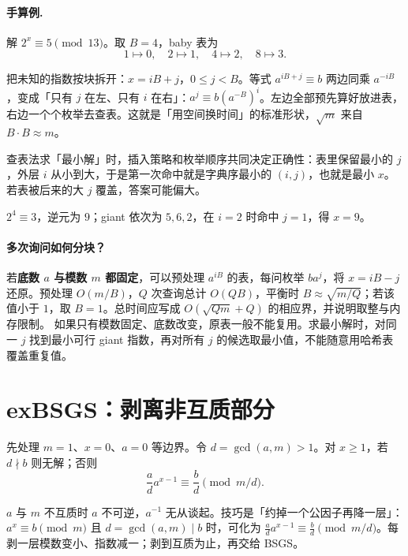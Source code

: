\documentclass[UTF8,a4paper,11pt,twoside,openright,fontset=fandol]{ctexbook}
\theoremstyle{definition}
\begin{document}
\paragraph{手算例.} 解 $2^x\equiv5\pmod{13}$。取 $B=4$，baby 表为
\[
1\mapsto0,\quad2\mapsto1,\quad4\mapsto2,\quad8\mapsto3.
\]

\begin{tip}
把未知的指数按块拆开：$x=iB+j$，$0\le j<B$。等式 $a^{iB+j}\equiv b$ 两边同乘 $a^{-iB}$，变成「只有 $j$ 在左、只有 $i$ 在右」：$a^j\equiv b(a^{-B})^i$。左边全部预先算好放进表，右边一个个枚举去查表。这就是「用空间换时间」的标准形状，$\sqrt m$ 来自 $B\cdot B\approx m$。
\end{tip}

\begin{tip}
查表法求「最小解」时，插入策略和枚举顺序共同决定正确性：表里保留最小的 $j$，外层 $i$ 从小到大，于是第一次命中就是字典序最小的 $(i,j)$，也就是最小 $x$。若表被后来的大 $j$ 覆盖，答案可能偏大。
\end{tip}

$2^4\equiv3$，逆元为 $9$；giant 依次为 $5,6,2$，在 $i=2$ 时命中 $j=1$，得 $x=9$。

\paragraph{多次询问如何分块？}
若\textbf{底数 $a$ 与模数 $m$ 都固定}，可以预处理 $a^{iB}$ 的表，每问枚举 $ba^j$，将 $x=iB-j$ 还原。预处理 $O(m/B)$，$Q$ 次查询总计 $O(QB)$，平衡时 $B\approx\sqrt{m/Q}$；若该值小于 $1$，取 $B=1$。总时间应写成 $O(\sqrt{Qm}+Q)$ 的相应界，并说明取整与内存限制。
如果只有模数固定、底数改变，原表一般不能复用。求最小解时，对同一 $j$ 找到最小可行 giant 指数，再对所有 $j$ 的候选取最小值，不能随意用哈希表覆盖重复值。


\section{exBSGS：剥离非互质部分}
先处理 $m=1$、$x=0$、$a=0$ 等边界。令 $d=\gcd(a,m)>1$。对 $x\ge1$，若 $d\nmid b$ 则无解；否则
\[
 \frac ad a^{x-1}\equiv\frac bd\pmod{m/d}.
\]

\begin{tip}
$a$ 与 $m$ 不互质时 $a$ 不可逆，$a^{-1}$ 无从谈起。技巧是「约掉一个公因子再降一层」：$a^x\equiv b\pmod m$ 且 $d=\gcd(a,m)\mid b$ 时，可化为 $\frac ad a^{x-1}\equiv\frac b d\pmod{m/d}$。每剥一层模数变小、指数减一；剥到互质为止，再交给 BSGS。
\end{tip}
\end{document}
